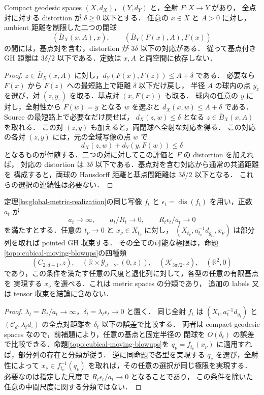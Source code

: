 \begin{lemma}[全域の歪みから同半径の閉球への移送]
\label{ke:distortion-to-pointed-balls}
Compact geodesic spaces $(X,d_X)$，$(Y,d_Y)$ と，全射 $F:X\to Y$ があり，
全点対に対する distortion が $\delta\ge0$ 以下とする．
任意の $x\in X$ と $A>0$ に対し，ambient 距離を制限した二つの閉球
\[
 (\overline B_X(x,A),x),\qquad
 (\overline B_Y(F(x),A),F(x))
\]
の間には，基点対を含む，distortion が $3\delta$ 以下の対応がある．
従って基点付き GH 距離は $3\delta/2$ 以下である．定数は $x,A$ と両空間に依存しない．
\end{lemma}
\begin{proof}
$z\in\overline B_X(x,A)$ に対し，$d_Y(F(x),F(z))\le A+\delta$ である．
必要なら $F(x)$ から $F(z)$ への最短路上で距離 $\delta$ 以下だけ戻し，
半径 $A$ の球内の点 $y_z$ を選び，対 $(z,y_z)$ を取る．基点対 $(x,F(x))$ も取る．
球内の任意の $y$ に対し，全射性から $F(w)=y$ となる $w$ を選ぶと
$d_X(x,w)\le A+\delta$ である．Source の最短路上で必要なだけ戻せば，
$d_X(z,w)\le\delta$ となる $z\in\overline B_X(x,A)$ を取れる．
この対 $(z,y)$ も加えると，両閉球へ全射な対応を得る．
この対応の各対 $(z,y)$ には，元の全域写像の点 $w$ で
\[
 d_X(z,w)+d_Y(y,F(w))\le\delta
\]
となるものが付随する．二つの対に対してこの評価と $F$ の distortion を加えれば，
対応の distortion は $3\delta$ 以下である．基点対を含む対応から通常の共通距離を
構成すると，両球の Hausdorff 距離と基点間距離は $3\delta/2$ 以下となる．
これらの選択の連続性は必要ない．
\end{proof}

\begin{corollary}[同じ射影で制御される中間尺度の全移動基点極限]
\label{ke:intermediate-moving-classification}
定理\ref{ke:global-metric-realization}の同じ写像 $f_t$ と
$\epsilon_t=\operatorname{dis}(f_t)$ を用い，正数 $a_t$ が
\[
 a_t\longrightarrow\infty,\qquad a_t/R_t\longrightarrow0,
 \qquad R_t\epsilon_t/a_t\longrightarrow0
\]
を満たすとする．任意の $t_\nu\to0$ と $x_\nu\in X_{t_\nu}$ に対し，
$(X_{t_\nu},a_{t_\nu}^{-1}d_{g_{t_\nu}},x_\nu)$ は部分列を取れば pointed GH 収束する．
その全ての可能な極限は，命題\ref{topo:cubical-moving-blowups}の四種類
\[
 (C_{2,d-1},z),\quad
 (\mathbb R\times\mathcal Y_{d-2},(0,z)),\quad
 (\mathcal K_{3\pi/2},z),\quad
 (\mathbb R^2,0)
\]
であり，この条件を満たす任意の尺度と退化列に対して，各型の任意の有限基点を
実現する $x_\nu$ を選べる．これは metric spaces の分類であり，
追加の labels 又は tensor 収束を結論に含めない．
\end{corollary}
\begin{proof}
$\lambda_t=R_t/a_t\to\infty$，$\delta_t=\lambda_t\epsilon_t\to0$ と置く．
同じ全射 $f_t$ は $(X_t,a_t^{-1}d_{g_t})$ と
$(\mathcal C_d,\lambda_t d_\square)$ の全点対距離を $\delta_t$ 以下の誤差で比較する．
両者は compact geodesic spaces なので，前補題により，任意の基点と固定半径の
閉球を $O(\delta_t)$ の誤差で比較できる．命題\ref{topo:cubical-moving-blowups}を
$q_\nu=f_{t_\nu}(x_\nu)$ に適用すれば，部分列の存在と分類が従う．
逆に同命題で各型を実現する $q_\nu$ を選び，全射性によって
$x_\nu\in f_{t_\nu}^{-1}(q_\nu)$ を取れば，その任意の選択が同じ極限を実現する．
必要なのは指定した尺度で $R_t\epsilon_t/a_t\to0$ となることであり，
この条件を除いた任意の中間尺度に関する分類ではない．
\end{proof}

